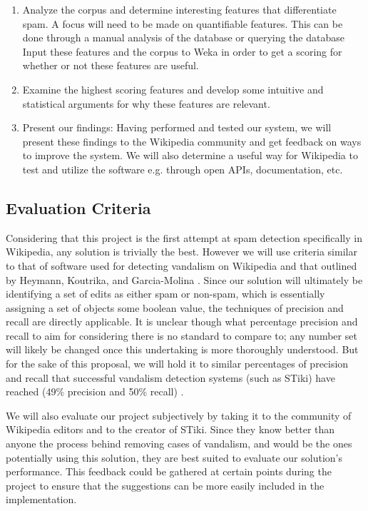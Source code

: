\documentclass[letterpaper]{sig-alternate}
\begin{document}
\begin{enumerate}
\item Analyze the corpus and determine interesting features that differentiate spam. A focus will need to be made on quantifiable features. This can be done through a manual analysis of the database or querying the database
Input these features and the corpus to Weka in order to get a scoring for whether or not these features are useful. 

\item Examine the highest scoring features and develop some intuitive and statistical arguments for why these features are relevant.

\item Present our findings: Having performed and tested our system, we will present these findings to the Wikipedia community and get feedback on ways to improve the system. We will also determine a useful way for Wikipedia to test and utilize the software e.g. through open APIs, documentation, etc.
\end{enumerate}

\subsection{Evaluation Criteria}
\label{subsec:eval_criteria}
Considering that this project is the first attempt at spam detection specifically in Wikipedia, any solution is trivially the best. However we will use criteria similar to that of software used for detecting vandalism on Wikipedia and that outlined by Heymann, Koutrika, and Garcia-Molina \cite{survey_social_spam}. Since our solution will ultimately be identifying a set of edits as either spam or non-spam, which is essentially assigning a set of objects some boolean value, the techniques of precision and recall are directly applicable. It is unclear though what percentage precision and recall to aim for considering there is no standard to compare to; any number set will likely be changed once this undertaking is more thoroughly understood. But for the sake of this proposal, we will hold it to similar percentages of precision and recall that successful vandalism detection systems (such as STiki) have reached (49\% precision and 50\% recall) \cite{wiki_vandalism}. 

We will also evaluate our project subjectively by taking it to the community of Wikipedia editors and to the creator of STiki. Since they know better than anyone the process behind removing cases of vandalism, and would be the ones potentially using this solution, they are best suited to evaluate our solution's performance. This feedback could be gathered at certain points during the project to ensure that the suggestions can be more easily included in the implementation.
\end{document}
